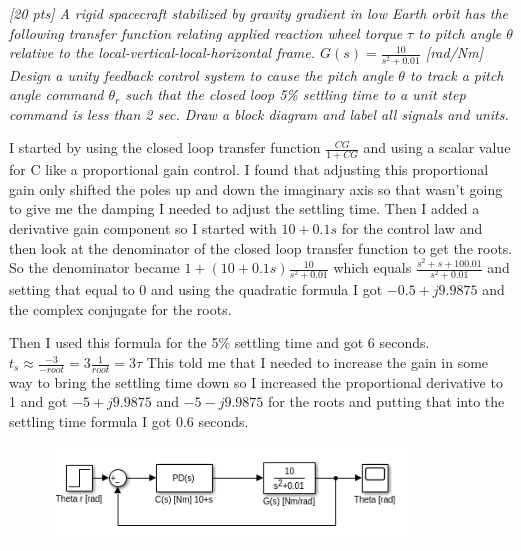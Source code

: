 \documentclass{article}
\begin{document}
\section{}
\textit{[20 pts] A rigid spacecraft stabilized by gravity gradient in low Earth orbit has the following transfer function relating applied reaction wheel torque $\tau$ to pitch angle $\theta$ relative to the local-vertical-local-horizontal frame. $G(s) = \frac{10}{s^2 + 0.01}$ [rad/Nm] Design a unity feedback control system to cause the pitch angle $\theta$ to track a pitch angle command $\theta_r$ such that the closed loop 5\% settling time to a unit step command is less than 2 sec. Draw a block diagram and label all signals and units.}

I started by using the closed loop transfer function $\frac{CG}{1+CG}$ and using a scalar value for C like a proportional gain control.
I found that adjusting this proportional gain only shifted the poles up and down the imaginary axis so that wasn't going to give me the damping I needed to adjust the settling time.
Then I added a derivative gain component so I started with $10+0.1s$ for the control law and then look at the denominator of the closed loop transfer function to get the roots.
So the denominator became $1 + (10+0.1s) \frac{10}{s^2 +0.01}$ which equals $\frac{s^2+s+100.01}{s^2+0.01}$ and setting that equal to 0 and using the quadratic formula I got $-0.5 + j9.9875$ and the complex conjugate for the roots.

Then I used this formula for the 5\% settling time and got 6 seconds.
$t_s \approx \frac{-3}{-root} = 3 \frac{1}{root} = 3 \tau$
This told me that I needed to increase the gain in some way to bring the settling time down so I increased the proportional derivative to 1 and got $-5 + j9.9875$ and $-5 - j9.9875$ for the roots and putting that into the settling time formula I got 0.6 seconds.

\begin{figure}[H]
    \centering
    \includegraphics[width=0.85\textwidth]{q3model.png}
\end{figure}

\section{}
\end{document}
